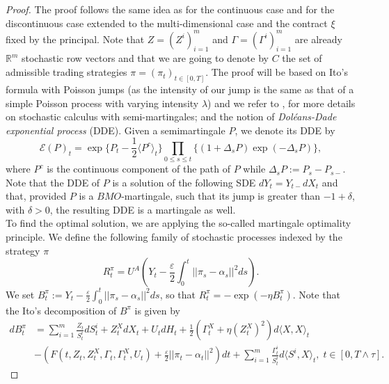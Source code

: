 \documentclass[11pt,a4paper]{article}
\theoremstyle{thmstyleone}%
\theoremstyle{thmstyletwo}%
\theoremstyle{thmstylethree}%
\newcommand{\T}{T \wedge \tau}
\begin{document}
\begin{proof}


    The proof follows the same idea as \cite{hu2005utility} for the continuous case and \cite{jeanblanc2015utility, morlais2009utility} for the discontinuous case extended to the multi-dimensional case and the contract $\xi$ fixed by the principal. Note that $Z = (Z^i)_{i=1}^m$ and $\Gamma = (\Gamma^i)_{i=1}^m$ are already $\mathbb{R}^m$ stochastic row vectors and that we are going to denote by $C$ the set of admissible trading strategies $\pi = (\pi_t)_{t \in [0, T]}$. The proof will be based on Ito's formula with Poisson jumps (as the intensity of our jump is the same as that of a simple Poisson process with varying intensity $\lambda$) and we refer to \cite{privault2022introduction,ikeda2014stochastic}, for more details on stochastic calculus with semi-martingales; and the notion of \emph{Doléans-Dade exponential process} (DDE). Given a semimartingale $P$, we denote its DDE by 
        \[
            \mathcal{E}(P)_t = \exp\{ P_t - \frac{1}{2} \langle P^c \rangle_t\} \prod_{0 \leq s \leq t}\{(1 + \Delta_s P) \exp( -\Delta_s P)\},
        \]
        where $P^c$ is the continuous component of the path of $P$ while $\Delta_s P:=P_s-P_{s-}$.
        Note that the DDE of $P$ is a solution of the following SDE $dY_t = Y_{t-} dX_t$
        and that, provided $P$ is a $BMO$-martingale, such that its jump is greater than $-1+\delta$, with $\delta > 0$, the resulting DDE is a martingale as well.\\

        
To find the optimal solution, we are applying the so-called martingale optimality principle. We define the following family of stochastic processes indexed by the strategy $\pi$
    \begin{equation*}
        R^{\pi}_{t} = U^A(Y_t - \frac{\varepsilon}2\int_0^t ||\pi_s - \alpha_s||^2 ds).
    \end{equation*}
    We set $B^\pi_t := Y_t - \frac{\varepsilon}2\int_0^t ||\pi_s - \alpha_s||^2 ds$, so that $R^\pi_t = -\exp{(-\eta B^\pi_t)}$. Note that the Ito's decomposition of $B^\pi$ is given by
    \begin{align*}
        dB^\pi_t 
        &= \sum_{i=1}^{m}\frac{Z_t}{S^i_t} dS^i_t + Z_t^X dX_t + U_t dH_t + \frac{1}{2} (\Gamma_t^X + \eta (Z_t^X)^2 ) d\langle X, X\rangle_t\\
        &- (F(t, Z_t, Z_t^X, \Gamma_t, \Gamma_t^X,U_t) + \frac{\varepsilon}2||\pi_t - \alpha_t||^2) dt + \sum_{i=1}^{m}\frac{\Gamma^i_t}{S^i_t} d\langle S^i, X\rangle_t,\; t \in [0, \T].
    \end{align*}


\end{proof}
\end{document}
